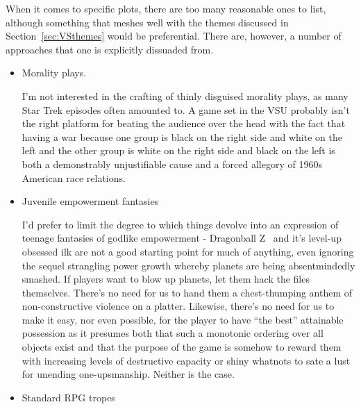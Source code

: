 When it comes to specific plots, there are too many reasonable ones to
list, although something that meshes well with the themes discussed in
Section~\ref{sec:VSthemes} would be preferential. There are, however,
a number of approaches that one is explicitly dissuaded from. 
\begin{itemize}

\item Morality plays. 

I'm not interested in the crafting of thinly disguised morality plays,
as many Star Trek episodes often amounted to. A game set in the VSU
probably isn't the right platform for beating the audience over the
head with the fact that having a war because one group is black on the
right side and white on the left and the other group is white on the
right side and black on the left is both a demonstrably unjustifiable
cause and a forced allegory of 1960s American race relations.

\item Juvenile empowerment fantasies

I'd prefer to limit the degree to which things devolve into an
expression of teenage fantasies of godlike empowerment - Dragonball Z~\cite{DBZ}
and it's level-up obsessed ilk are not a good starting point for much of
anything, even ignoring the sequel strangling power growth whereby
planets are being absentmindedly smashed. If players want to blow up
planets, let them hack the files themselves. There's no need for us to
hand them a chest-thumping anthem of non-constructive violence on a
platter. Likewise, there's no need for us to make it easy, nor even
possible, for the player to have ``the best'' attainable possession as it presumes both
that such a monotonic ordering over all objects exist and that the
purpose of the game is somehow to reward them with increasing levels
of destructive capacity or shiny whatnots to sate a lust for unending
one-upsmanship. Neither is the case.

\item Standard RPG tropes


\end{itemize}

